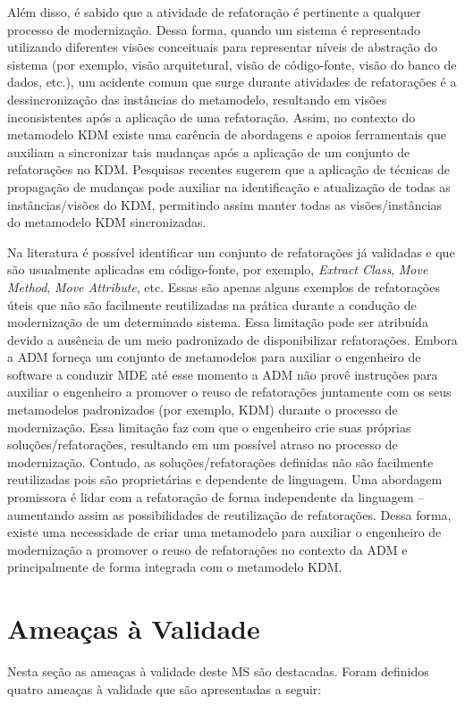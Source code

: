 Além disso, é sabido que a atividade de refatoração é pertinente a qualquer processo de modernização. Dessa forma, quando um sistema é representado utilizando diferentes visões conceituais para representar níveis de abstração do sistema (por exemplo, visão arquitetural, visão de código-fonte, visão do banco de dados, etc.), um acidente comum que surge durante atividades de refatorações é a dessincronização das instâncias do metamodelo, resultando em visões inconsistentes após a aplicação de uma refatoração. Assim, no contexto do metamodelo KDM existe uma carência de abordagens e apoios ferramentais que auxiliam a sincronizar tais mudanças após a aplicação de um conjunto de refatorações no KDM. Pesquisas recentes sugerem que a aplicação de técnicas de propagação de mudanças pode auxiliar na identificação e atualização de todas as instâncias/visões do KDM, permitindo assim manter todas as visões/instâncias do metamodelo KDM sincronizadas. 

Na literatura é possível identificar um conjunto de refatorações já validadas e que são usualmente aplicadas em código-fonte, por exemplo, \textit{Extract Class}, \textit{Move Method}, \textit{Move Attribute}, etc. Essas são apenas alguns exemplos de refatorações úteis que não são facilmente reutilizadas na prática durante a condução de modernização de um determinado sistema. Essa limitação pode ser atribuída devido a ausência de um meio padronizado de disponibilizar refatorações. Embora a ADM forneça um conjunto de metamodelos para auxiliar o engenheiro de software a conduzir MDE até esse momento a ADM não provê instruções para auxiliar o engenheiro a promover o reuso de refatorações juntamente com os seus metamodelos padronizados (por exemplo, KDM) durante o processo de modernização. Essa limitação faz com que o engenheiro crie suas próprias soluções/refatorações, resultando em um possível atraso no processo de modernização. Contudo, as soluções/refatorações definidas não são facilmente reutilizadas pois são proprietárias e dependente de linguagem. Uma abordagem promissora é lidar com a refatoração de forma independente da linguagem – aumentando assim as possibilidades de reutilização de refatorações. Dessa forma, existe uma necessidade de criar uma metamodelo para auxiliar o engenheiro de modernização a promover o reuso de refatorações no contexto da ADM e principalmente de forma integrada com o metamodelo KDM. 

\section{Ameaças à Validade}
Nesta seção as ameaças à validade deste MS são destacadas. Foram definidos quatro ameaças à validade que são apresentadas a seguir:

